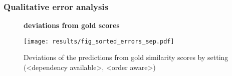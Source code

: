 \subsubsection{Qualitative error analysis}

\begin{figure}[htb!]
  \centering
  \textbf{deviations from gold scores}\par\medskip
  \texttt{[image: results/fig\_sorted\_errors\_sep.pdf]}
  \caption{Deviations of the predictions from gold similarity scores by setting (<dependency available>, <order aware>)}
  \label{fig:fig_sorted_errors_sep}
 \end{figure}


